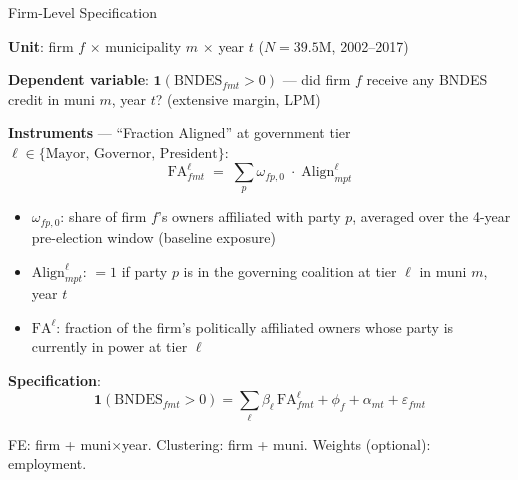 \documentclass[aspectratio=169,11pt]{beamer}
\newcommand{\Align}{\mathrm{Align}}
\newcommand{\FA}{\mathrm{FA}}
\begin{document}
\begin{frame}[shrink=5]{Firm-Level Specification}

\textbf{Unit}: firm $f$ $\times$ municipality $m$ $\times$ year $t$ \quad ($N = 39.5$M, 2002--2017)

\smallskip

\textbf{Dependent variable}: $\mathbf{1}(\text{BNDES}_{fmt} > 0)$ --- did firm $f$ receive any BNDES credit in muni $m$, year $t$? (extensive margin, LPM)

\smallskip

\textbf{Instruments} --- ``Fraction Aligned'' at government tier $\ell \in \{\text{Mayor, Governor, President}\}$:
\begin{equation*}
    \FA^\ell_{fmt} \;=\; \sum_{p} \omega_{fp,0} \;\cdot\; \Align^\ell_{mpt}
\end{equation*}

\vspace{-6pt}
\begin{itemize}\setlength{\itemsep}{2pt}
    \item $\omega_{fp,0}$: share of firm $f$'s owners affiliated with party $p$, averaged over the 4-year pre-election window (baseline exposure)
    \item $\Align^\ell_{mpt}$: $=1$ if party $p$ is in the governing coalition at tier $\ell$ in muni $m$, year $t$
    \item $\FA^\ell$: fraction of the firm's politically affiliated owners whose party is currently in power at tier $\ell$
\end{itemize}

\smallskip

\textbf{Specification}:
\begin{equation*}
    \mathbf{1}(\text{BNDES}_{fmt} > 0) = \sum_\ell \beta_\ell \, \FA^\ell_{fmt} + \phi_f + \alpha_{mt} + \varepsilon_{fmt}
\end{equation*}

\vspace{-6pt}
{\footnotesize FE: firm + muni$\times$year. Clustering: firm + muni. Weights (optional): employment.}

\end{frame}
\end{document}
